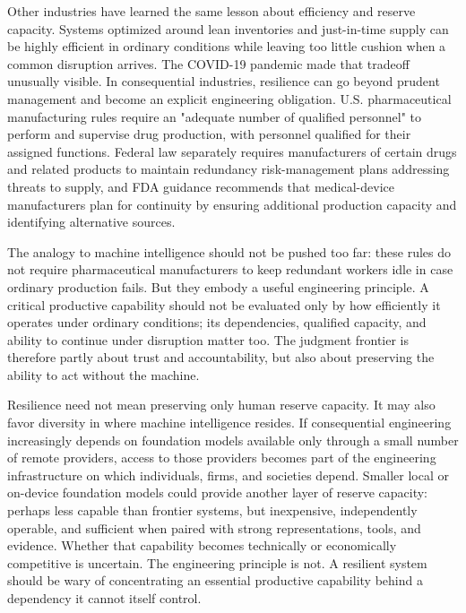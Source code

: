 Other industries have learned the same lesson about efficiency and reserve capacity. Systems optimized around lean inventories and just-in-time supply can be highly efficient in ordinary conditions while leaving too little cushion when a common disruption arrives. The COVID-19 pandemic made that tradeoff unusually visible\citep{nasem-supply-chain-resilience}. In consequential industries, resilience can go beyond prudent management and become an explicit engineering obligation. U.S. pharmaceutical manufacturing rules require an "adequate number of qualified personnel" to perform and supervise drug production, with personnel qualified for their assigned functions\citep{cfr-211-25}. Federal law separately requires manufacturers of certain drugs and related products to maintain redundancy risk-management plans addressing threats to supply,\citep{fdc-506c-redundancy} and FDA guidance recommends that medical-device manufacturers plan for continuity by ensuring additional production capacity and identifying alternative sources\citep{fda-device-supply-chain-guidance}.

The analogy to machine intelligence should not be pushed too far: these rules do not require pharmaceutical manufacturers to keep redundant workers idle in case ordinary production fails. But they embody a useful engineering principle. A critical productive capability should not be evaluated only by how efficiently it operates under ordinary conditions; its dependencies, qualified capacity, and ability to continue under disruption matter too. The judgment frontier is therefore partly about trust and accountability, but also about preserving the ability to act without the machine.


Resilience need not mean preserving only human reserve capacity. It may also favor diversity in where machine intelligence resides. If consequential engineering increasingly depends on foundation models available only through a small number of remote providers, access to those providers becomes part of the engineering infrastructure on which individuals, firms, and societies depend. Smaller local or on-device foundation models could provide another layer of reserve capacity: perhaps less capable than frontier systems, but inexpensive, independently operable, and sufficient when paired with strong representations, tools, and evidence. Whether that capability becomes technically or economically competitive is uncertain. The engineering principle is not. A resilient system should be wary of concentrating an essential productive capability behind a dependency it cannot itself control.

